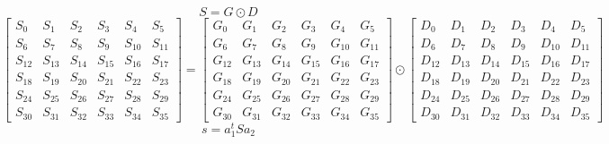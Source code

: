 \documentclass{article}%
\begin{document}
\[%
S = G \odot D%
\]%
\[%
\left[\begin{matrix}S_{0} & S_{1} & S_{2} & S_{3} & S_{4} & S_{5}\\S_{6} & S_{7} & S_{8} & S_{9} & S_{10} & S_{11}\\S_{12} & S_{13} & S_{14} & S_{15} & S_{16} & S_{17}\\S_{18} & S_{19} & S_{20} & S_{21} & S_{22} & S_{23}\\S_{24} & S_{25} & S_{26} & S_{27} & S_{28} & S_{29}\\S_{30} & S_{31} & S_{32} & S_{33} & S_{34} & S_{35}\end{matrix}\right] = \left[\begin{matrix}G_{0} & G_{1} & G_{2} & G_{3} & G_{4} & G_{5}\\G_{6} & G_{7} & G_{8} & G_{9} & G_{10} & G_{11}\\G_{12} & G_{13} & G_{14} & G_{15} & G_{16} & G_{17}\\G_{18} & G_{19} & G_{20} & G_{21} & G_{22} & G_{23}\\G_{24} & G_{25} & G_{26} & G_{27} & G_{28} & G_{29}\\G_{30} & G_{31} & G_{32} & G_{33} & G_{34} & G_{35}\end{matrix}\right] \odot \left[\begin{matrix}D_{0} & D_{1} & D_{2} & D_{3} & D_{4} & D_{5}\\D_{6} & D_{7} & D_{8} & D_{9} & D_{10} & D_{11}\\D_{12} & D_{13} & D_{14} & D_{15} & D_{16} & D_{17}\\D_{18} & D_{19} & D_{20} & D_{21} & D_{22} & D_{23}\\D_{24} & D_{25} & D_{26} & D_{27} & D_{28} & D_{29}\\D_{30} & D_{31} & D_{32} & D_{33} & D_{34} & D_{35}\end{matrix}\right]%
\]%
\[%
s = a_1^t S a_2%
\]%
\end{document}
